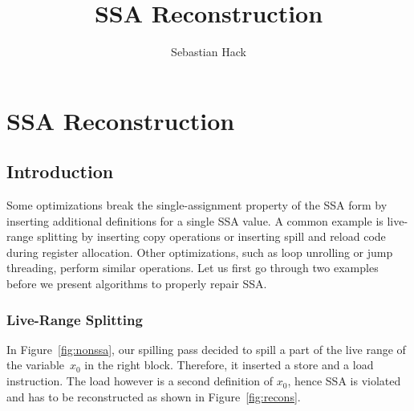 
\newcommand{\var}[1]{\ensuremath{\mathtt{#1}}}

\title{SSA Reconstruction}
\author{Sebastian Hack}

\chapter{SSA Reconstruction }
\graphicspath{{repair_maintain_ssa_after_optimization/}{part1/repair_maintain_ssa_after_optimization/}}



\section{Introduction}

Some optimizations break the single-assignment property of the SSA form by inserting additional definitions for a single SSA value.
A common example is live-range splitting by inserting copy operations or inserting spill and reload code during register allocation.
Other optimizations, such as loop unrolling or jump threading, perform similar operations.
Let us first go through two examples before we present algorithms to properly repair SSA.

\subsection{Live-Range Splitting}

In Figure~\ref{fig:nonssa}, our spilling pass decided to spill a part of the live range of the variable~$x_0$ in the right block.
Therefore, it inserted a store and a load instruction. 
The load however is a second definition of $x_0$, hence SSA is violated and has to be reconstructed as shown in Figure~\ref{fig:recons}.

